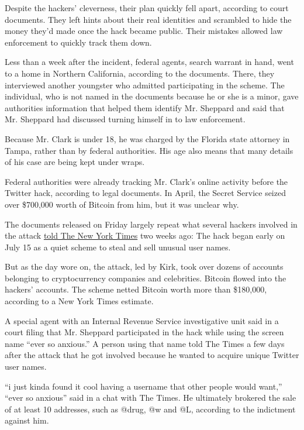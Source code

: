 Despite the hackers' cleverness, their plan quickly fell apart,
according to court documents. They left hints about their real
identities and scrambled to hide the money they'd made once the hack
became public. Their mistakes allowed law enforcement to quickly track
them down.

Less than a week after the incident, federal agents, search warrant in
hand, went to a home in Northern California, according to the documents.
There, they interviewed another youngster who admitted participating in
the scheme. The individual, who is not named in the documents because he
or she is a minor, gave authorities information that helped them
identify Mr. Sheppard and said that Mr. Sheppard had discussed turning
himself in to law enforcement.

Because Mr. Clark is under 18, he was charged by the Florida state
attorney in Tampa, rather than by federal authorities. His age also
means that many details of his case are being kept under wraps.

Federal authorities were already tracking Mr. Clark's online activity
before the Twitter hack, according to legal documents. In April, the
Secret Service seized over \$700,000 worth of Bitcoin from him, but it
was unclear why.

The documents released on Friday largely repeat what several hackers
involved in the attack
\href{https://www.nytimes.com/2020/07/17/technology/twitter-hackers-interview.html}{told
The New York Times} two weeks ago: The hack began early on July 15 as a
quiet scheme to steal and sell unusual user names.

But as the day wore on, the attack, led by Kirk, took over dozens of
accounts belonging to cryptocurrency companies and celebrities. Bitcoin
flowed into the hackers' accounts. The scheme netted Bitcoin worth more
than \$180,000, according to a New York Times estimate.

A special agent with an Internal Revenue Service investigative unit said
in a court filing that Mr. Sheppard participated in the hack while using
the screen name ``ever so anxious.'' A person using that name told The
Times a few days after the attack that he got involved because he wanted
to acquire unique Twitter user names.

``i just kinda found it cool having a username that other people would
want,'' ``ever so anxious'' said in a chat with The Times. He ultimately
brokered the sale of at least 10 addresses, such as @drug, @w and @L,
according to the indictment against him.

